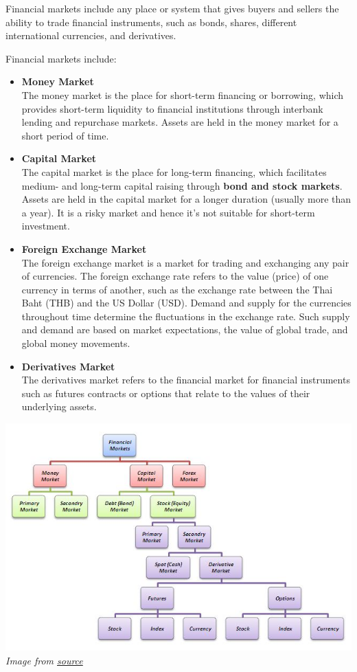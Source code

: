 \documentclass[
]{book}
\theoremstyle{definition}
\theoremstyle{definition}
\theoremstyle{definition}
\theoremstyle{definition}
\theoremstyle{remark}
\begin{document}
Financial markets include any place or system that gives buyers and sellers the ability to trade financial instruments, such as bonds, shares, different international currencies, and derivatives.

Financial markets include:

\begin{itemize}
\item
  \textbf{Money Market}\\
  The money market is the place for short-term financing or borrowing, which provides short-term liquidity to financial institutions through interbank lending and repurchase markets. Assets are held in the money market for a short period of time.
\item
  \textbf{Capital Market}\\
  The capital market is the place for long-term financing, which facilitates medium- and long-term capital raising through \textbf{bond and stock markets}. Assets are held in the capital market for a longer duration (usually more than a year). It is a risky market and hence it's not suitable for short-term investment.
\item
  \textbf{Foreign Exchange Market}\\
  The foreign exchange market is a market for trading and exchanging any pair of currencies. The foreign exchange rate refers to the value (price) of one currency in terms of another, such as the exchange rate between the Thai Baht (THB) and the US Dollar (USD). Demand and supply for the currencies throughout time determine the fluctuations in the exchange rate. Such supply and demand are based on market expectations, the value of global trade, and global money movements.
\item
  \textbf{Derivatives Market}\\
  The derivatives market refers to the financial market for financial instruments such as futures contracts or options that relate to the values of their underlying assets.
\end{itemize}

\includegraphics{FigFinancialSystem.jpeg}
\emph{Image from \href{https://1.bp.blogspot.com/}{source}}
\end{document}
